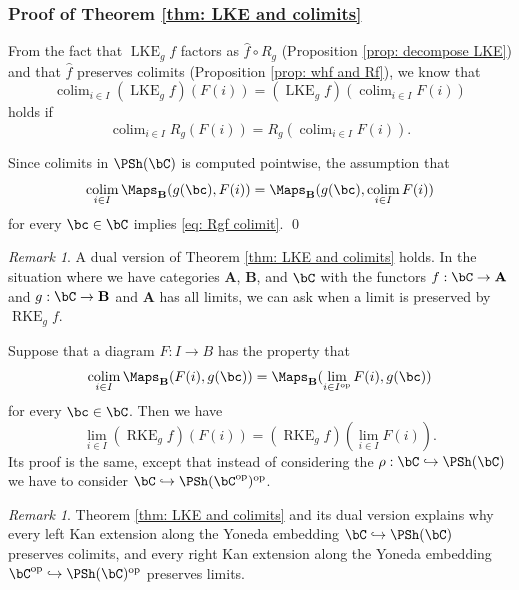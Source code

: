 \documentclass[10pt]{amsart}
\newcommand{\sssec}{\subsubsection}
\theoremstyle{remark}
\newtheorem{rmk}[subsubsection]{Remark}
\newcommand{\wh}{\widehat}
\newcommand{\on}{\operatorname}
\DeclareMathOperator{\op}{op}
\DeclareMathOperator{\colim}{colim}
\newcommand{\bA}{\mathbf{A}}
\newcommand{\bB}{\mathbf{B}}
\begin{document}
\sssec{Proof of Theorem \ref{thm: LKE and colimits}}
From the fact that $\on{LKE}_g f$ factors as $\wh{f}\circ R_g$ (Proposition \ref{prop: decompose LKE}) and that $\wh{f}$ preserves colimits (Proposition \ref{prop: whf and Rf}), we know that
\[\colim_{i\in I}(\on{LKE}_g f)(F(i))=(\on{LKE}_g f)(\colim_{i\in I}F(i))\]
holds if
\begin{equation}\label{eq: Rgf colimit}
    \colim_{i\in I}R_g(F(i))=R_g(\colim_{i\in I}F(i)).
\end{equation}

Since colimits in $\PSh(\bC)$ is computed pointwise, the assumption that
\[\colim_{i\in I} \Maps_{\bB}(g(\bc),F(i))=\Maps_{\bB}(g(\bc),\colim_{i\in I}F(i))\]
    for every $\bc\in \bC$ implies \eqref{eq: Rgf colimit}.
\qed


\begin{rmk}
    A dual version of Theorem \ref{thm: LKE and colimits} holds. In the situation where we have categories $\bA$, $\bB$, and $\bC$ with the functors $f:\bC\rightarrow\bA$ and $g:\bC\rightarrow\bB$ and $\bA$ has all limits, we can ask when a limit is preserved by $\on{RKE}_g f$.
    \medskip

    Suppose that a diagram $F:I\rightarrow B$ has the property that
    \begin{equation}\label{eq: assumption for RKE lemma}
        \colim_{i\in I} \Maps_{\bB}
        (F(i),g(\bc))=\Maps_{\bB}(\lim_{i\in I^{\op}}F(i),g(\bc))
    \end{equation}
    for every $\bc\in \bC$. Then we have
    \[\lim_{i\in I}(\on{RKE}_g f)(F(i))=(\on{RKE}_g f)(\lim_{i\in I}F(i)).
    \]
    Its proof is the same, except that instead of considering the $\rho: \bC\hookrightarrow \PSh(\bC)$ we have to consider $\bC\hookrightarrow \PSh(\bC^{\op})^{\op}$.
\end{rmk}
\begin{rmk}
    Theorem \ref{thm: LKE and colimits} and its dual version explains why every left Kan extension along the Yoneda embedding $\bC\hookrightarrow\PSh(\bC)$ preserves colimits, and every right Kan extension along the Yoneda embedding $\bC^{\op}\hookrightarrow \PSh(\bC)^{\op}$ preserves limits.
\end{rmk}
\end{document}
